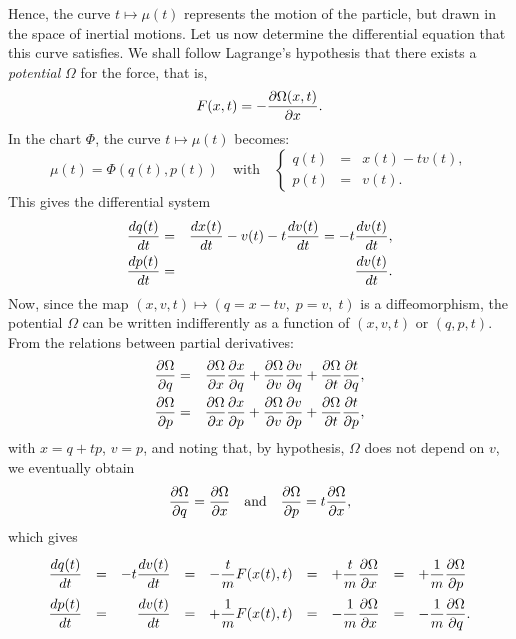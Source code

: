 Hence, the curve $t \mapsto \mu(t)$ represents the motion of the particle,
but drawn in the space of inertial motions. Let us now determine the differential
equation that this curve satisfies. We shall follow Lagrange's hypothesis that
there exists a {\em potential} $\Omega$ for the force, that is,
$$
  F(x,t) = -{\partial \Omega(x,t) \over \partial x}.
$$
In the chart $\Phi$, the curve $t\mapsto \mu(t)$ becomes:
$$
  \mu(t) = \Phi(q(t),p(t)) \quad \text{with} \quad
  \left\{
  \begin{array}{rcl}
  q(t) & = & x(t) - t v(t), \\
  p(t) & = & v(t).
  \end{array}
  \right.
$$
This gives the differential system
\begin{eqnarray*}
  {dq(t) \over dt} & = & {dx(t) \over dt} - v(t) - t{dv(t) \over dt} = -t{dv(t) \over dt},\\
  {dp(t) \over dt} & = & {dv(t) \over dt}.
\end{eqnarray*}
Now, since the map $(x,v,t) \mapsto (q=x-tv,\; p=v,\; t)$ is a diffeomorphism, the potential
$\Omega$ can be written indifferently as a function of $(x,v,t)$ or $(q,p,t)$.
From the relations between partial derivatives:
\begin{eqnarray*}
  {\partial \Omega \over \partial q} & = & {\partial \Omega \over \partial x}{\partial x \over \partial q}
  + {\partial \Omega \over \partial v}{\partial v \over \partial q}
  + {\partial \Omega \over \partial t}{\partial t \over \partial q}, \\
  {\partial \Omega \over \partial p} & = & {\partial \Omega \over \partial x}{\partial x \over \partial p}
  + {\partial \Omega \over \partial v}{\partial v \over \partial p}
  + {\partial \Omega \over \partial t}{\partial t \over \partial p},
\end{eqnarray*}
with $x = q + tp$, $v = p$, and noting that, by hypothesis,
$\Omega$ does not depend on $v$, we eventually obtain
$$
  {\partial \Omega \over \partial q} =  {\partial \Omega \over \partial x}
  \quad \text{and} \quad
  {\partial \Omega \over \partial p} = t {\partial \Omega \over \partial x},
$$
which gives
$$ \renewcommand{\arraystretch}{2}
  \begin{array}{rclcccccl}
  \displaystyle {dq(t) \over dt} & = & \displaystyle -t{dv(t) \over dt} & = & \displaystyle - {t\over m}F(x(t),t) & = & \displaystyle  + {t \over m} {\partial \Omega \over \partial x} & = & \displaystyle  + {1 \over m} {\partial \Omega \over \partial p} \\[1ex]
  \displaystyle {dp(t) \over dt} & = & \displaystyle \phantom{-t}{dv(t) \over dt} & = & \displaystyle +{1\over m}F(x(t),t) & = & \displaystyle - {1 \over m} {\partial \Omega \over \partial x} & = & \displaystyle - {1 \over m} {\partial \Omega \over \partial q}.
  \end{array}
$$
